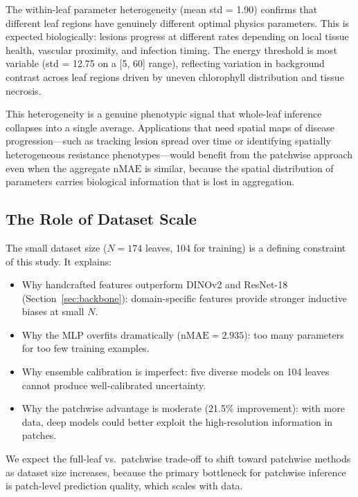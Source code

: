\documentclass[11pt,a4paper]{article}
\newcommand{\nMAE}{\mathrm{nMAE}}
\begin{document}
The within-leaf parameter heterogeneity (mean std = 1.90) confirms that different leaf regions have genuinely different optimal physics parameters.
This is expected biologically: lesions progress at different rates depending on local tissue health, vascular proximity, and infection timing.
The energy threshold is most variable (std = 12.75 on a [5, 60] range), reflecting variation in background contrast across leaf regions driven by uneven chlorophyll distribution and tissue necrosis.

This heterogeneity is a genuine phenotypic signal that whole-leaf inference collapses into a single average.
Applications that need spatial maps of disease progression---such as tracking lesion spread over time or identifying spatially heterogeneous resistance phenotypes---would benefit from the patchwise approach even when the aggregate $\nMAE$ is similar, because the spatial distribution of parameters carries biological information that is lost in aggregation.

\subsection{The Role of Dataset Scale}

The small dataset size ($N = 174$ leaves, 104 for training) is a defining constraint of this study.
It explains:
\begin{itemize}[nosep]
    \item Why handcrafted features outperform DINOv2 and ResNet-18 (Section~\ref{sec:backbone}): domain-specific features provide stronger inductive biases at small $N$.
    \item Why the MLP overfits dramatically ($\nMAE = 2.935$): too many parameters for too few training examples.
    \item Why ensemble calibration is imperfect: five diverse models on 104 leaves cannot produce well-calibrated uncertainty.
    \item Why the patchwise advantage is moderate (21.5\% improvement): with more data, deep models could better exploit the high-resolution information in patches.
\end{itemize}

We expect the full-leaf vs.\ patchwise trade-off to shift toward patchwise methods as dataset size increases, because the primary bottleneck for patchwise inference is patch-level prediction quality, which scales with data.


\end{document}
